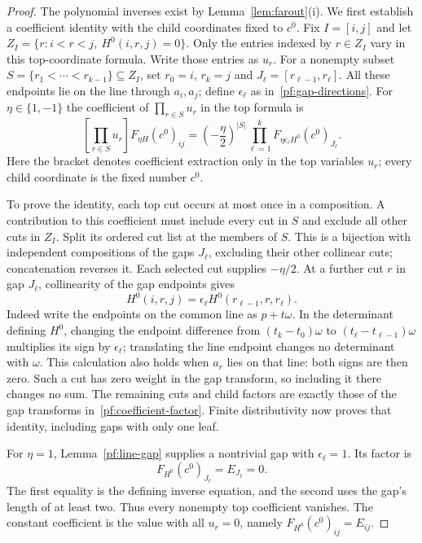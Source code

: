 \begin{proof}
The polynomial inverses exist by Lemma~\ref{lem:farout}(i).
We first establish a coefficient identity with the child coordinates
fixed to $c^0$. Fix $I=[i,j]$ and let
$Z_I=\{r:i<r<j,\ H^0(i,r,j)=0\}$. Only the entries indexed by
$r\in Z_I$ vary in this top-coordinate formula. Write those entries
as $u_r$. For a nonempty subset
$S=\{r_1<\cdots<r_{k-1}\}\subseteq Z_I$, set $r_0=i$, $r_k=j$
and $J_\ell=[r_{\ell-1},r_\ell]$. All these endpoints lie on the
line through $a_i,a_j$; define $\epsilon_\ell$ as
in~\eqref{pf:gap-directions}. For $\eta\in\{1,-1\}$ the coefficient
of $\prod_{r\in S}u_r$ in the top formula is
\begin{equation}\label{pf:coefficient-factor}
 \left[\prod_{r\in S}u_r\right]F_{\eta H}(c^0)_{ij}
 =\left(-\frac{\eta}{2}\right)^{|S|}
   \prod_{\ell=1}^{k}
      F_{\eta\epsilon_\ell H^0}(c^0)_{J_\ell}.
\end{equation}
Here the bracket denotes coefficient extraction only in the top
variables $u_r$; every child coordinate is the fixed number $c^0$.

To prove the identity, each top cut occurs at most once in a
composition. A contribution to this coefficient must include every
cut in $S$ and exclude all other cuts in $Z_I$. Split its ordered
cut list at the members of $S$. This is a bijection with independent
compositions of the gaps $J_\ell$, excluding their other collinear
cuts; concatenation reverses it. Each selected cut supplies
$-\eta/2$. At a further cut $r$ in gap $J_\ell$, collinearity of
the gap endpoints gives
\begin{equation}\label{pf:gap-sign-identity}
 H^0(i,r,j)=\epsilon_\ell
 H^0(r_{\ell-1},r,r_\ell).
\end{equation}
Indeed write the endpoints on the common line as $p+t\omega$.
In the determinant defining $H^0$, changing the endpoint difference
from $(t_k-t_0)\omega$ to
$(t_\ell-t_{\ell-1})\omega$ multiplies its sign by
$\epsilon_\ell$; translating the line endpoint changes no
determinant with $\omega$. This calculation also holds when $a_r$
lies on that line: both signs are then zero. Such a cut has zero
weight in the gap transform, so including it there changes no sum.
The remaining cuts and child factors are exactly those of the gap
transforms in~\eqref{pf:coefficient-factor}. Finite distributivity
now proves that identity, including gaps with only one leaf.

For $\eta=1$, Lemma~\ref{pf:line-gap} supplies a nontrivial gap
with $\epsilon_\ell=1$. Its factor is
\begin{equation}\label{pf:zero-gap-factor}
 F_{H^0}(c^0)_{J_\ell}=E_{J_\ell}=0.
\end{equation}
The first equality is the defining inverse equation, and the second
uses the gap's length of at least two. Thus every nonempty top
coefficient vanishes. The constant coefficient is the value with
all $u_r=0$, namely $F_{H^0}(c^0)_{ij}=E_{ij}$.


\end{proof}
